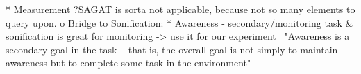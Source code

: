 
* Measurement
?SAGAT is sorta not applicable, because not so many elements to query upon.
o Bridge to Sonification: 
* Awareness - secondary/monitoring task \& sonification is great for monitoring -> use it for our experiment 
"Awareness is a secondary goal in the task – that is, the overall goal is not simply to maintain awareness but to complete some task in the environment"

